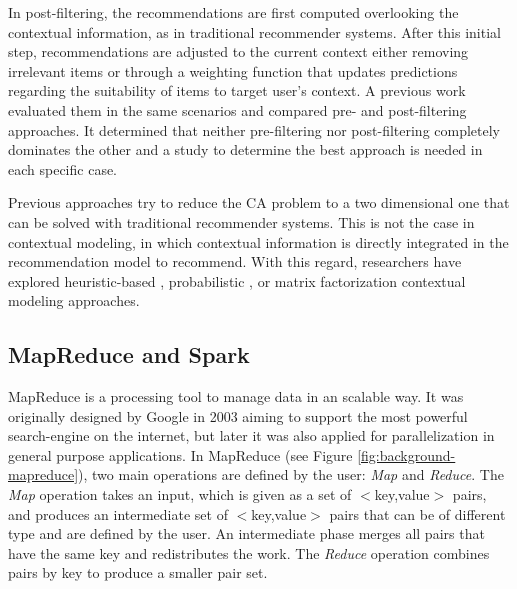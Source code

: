 \documentclass[preprint]{elsarticle}
\begin{document}
\begin{spacing}{1.5}
In post-filtering, the recommendations are first computed overlooking the contextual information, as in traditional recommender systems. After this initial step, recommendations are adjusted to the current context either removing irrelevant items or through a weighting function that updates predictions regarding the suitability of items to target user's context. A previous work \cite{Panniello2009} evaluated them in the same scenarios and compared pre- and post-filtering approaches. It determined that neither pre-filtering nor post-filtering completely dominates the other and a study to determine the best approach is needed in each specific case.

Previous approaches try to reduce the CA problem to a two dimensional one that can be solved with traditional recommender systems. This is not the case in contextual modeling, in which contextual information is directly integrated in the recommendation model to recommend. With this regard, researchers have explored heuristic-based \cite{Panniello2014}, probabilistic \cite{Adomavicius2005b}, or matrix factorization \cite{Baltrunas2011c} contextual modeling approaches.

\subsection{MapReduce and Spark}
\label{sec:background-mapreduce-and-spark}

MapReduce \cite{Dean2008} is a processing tool to manage data in an scalable way. It was originally designed by Google in 2003 aiming to support the most powerful search-engine on the internet, but later it was also applied for parallelization in general purpose applications. In MapReduce (see Figure \ref{fig:background-mapreduce}), two main operations are defined by the user: \emph{Map} and \emph{Reduce}. The \emph{Map} operation takes an input, which is given as a set of $<$key,value$>$ pairs, and produces an intermediate set of $<$key,value$>$ pairs that can be of different type and are defined by the user. An intermediate phase merges all pairs that have the same key and redistributes the work. The \emph{Reduce} operation combines pairs by key to produce a smaller pair set.


\end{spacing}
\end{document}
